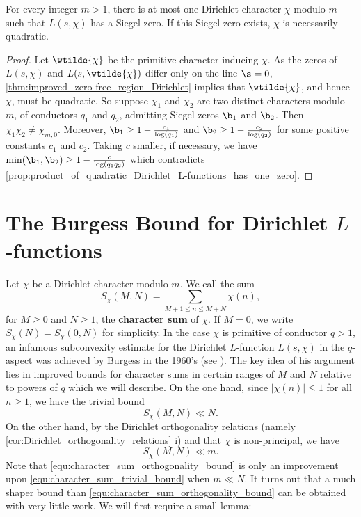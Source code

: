     \begin{proposition}\label{prop:at_most_one_Siegel_zero_per_modulus}
      For every integer \(m > 1\), there is at most one Dirichlet character \(\chi\) modulo \(m\) such that \(L(s,\chi)\) has a Siegel zero. If this Siegel zero exists, \(\chi\) is necessarily quadratic.
    \end{proposition}
    \begin{proof}
      Let \(\wtilde{\chi}\) be the primitive character inducing \(\chi\). As the zeros of \(L(s,\chi)\) and \(L(s,\wtilde{\chi})\) differ only on the line \(\s = 0\), \cref{thm:improved_zero-free_region_Dirichlet} implies that \(\wtilde{\chi}\), and hence \(\chi\), must be quadratic. So suppose \(\chi_{1}\) and \(\chi_{2}\) are two distinct characters modulo \(m\), of conductors \(q_{1}\) and \(q_{2}\), admitting Siegel zeros \(\b_{1}\) and \(\b_{2}\). Then \(\chi_{1}\chi_{2} \neq \chi_{m,0}\). Moreover, \(\b_{1} \ge 1-\frac{c_{1}}{\log(q_{1})}\) and \(\b_{2} \ge 1-\frac{c_{2}}{\log(q_{2})}\) for some positive constants \(c_{1}\) and \(c_{2}\). Taking \(c\) smaller, if necessary, we have \(\min(\b_{1},\b_{2}) \ge 1-\frac{c}{\log(q_{1}q_{2})}\) which contradicts \cref{prop:product_of_quadratic_Dirichlet_L-functions_has_one_zero}.
    \end{proof}
  \section{The Burgess Bound for Dirichlet \texorpdfstring{\(L\)}{L}-functions}
    Let \(\chi\) be a Dirichlet character modulo \(m\). We call the sum
    \[
      S_{\chi}(M,N) = \sum_{M+1 \le n \le M+N}\chi(n),
    \]
    for \(M \ge 0\) and \(N \ge 1\), the \textbf{character sum} of \(\chi\). If \(M = 0\), we write \(S_{\chi}(N) = S_{\chi}(0,N)\) for simplicity. In the case \(\chi\) is primitive of conductor \(q > 1\), an infamous subconvexity estimate for the Dirichlet \(L\)-function \(L(s,\chi)\) in the \(q\)-aspect was achieved by Burgess in the 1960's (see \cite{burgess1963character}). The key idea of his argument lies in improved bounds for character sums in certain ranges of \(M\) and \(N\) relative to powers of \(q\) which we will describe. On the one hand, since \(|\chi(n)| \le 1\) for all \(n \ge 1\), we have the trivial bound
    \begin{equation}\label{equ:character_sum_trivial_bound}
      S_{\chi}(M,N) \ll N.
    \end{equation}
    On the other hand, by the Dirichlet orthogonality relations (namely \cref{cor:Dirichlet_orthogonality_relations} i) and that \(\chi\) is non-principal, we have
    \begin{equation}\label{equ:character_sum_orthogonality_bound}
      S_{\chi}(M,N) \ll m.
    \end{equation}
    Note that \cref{equ:character_sum_orthogonality_bound} is only an improvement upon \cref{equ:character_sum_trivial_bound} when \(m \ll N\). It turns out that a much shaper bound than \cref{equ:character_sum_orthogonality_bound} can be obtained with very little work. We will first require a small lemma:

